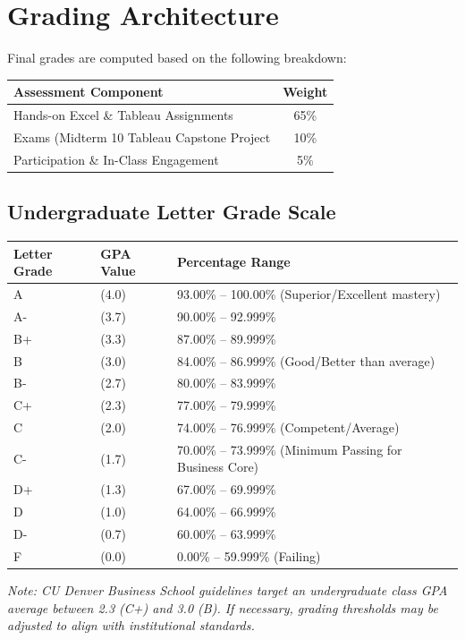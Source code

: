 \documentclass[11pt,a4paper]{article}
\begin{document}
\section*{Grading Architecture}
Final grades are computed based on the following breakdown:
\begin{center}
    \begin{tabular}{lc}
        \toprule
        \textbf{Assessment Component} & \textbf{Weight} \\
        \midrule
        Hands-on Excel \& Tableau Assignments & 65\% \\
        Exams (Midterm 10%
        Tableau Capstone Project & 10\% \\
        Participation \& In-Class Engagement & 5\% \\
        \bottomrule
    \end{tabular}
\end{center}

\subsection*{Undergraduate Letter Grade Scale}
\begin{center}
    \begin{tabular}{llp{7.5cm}}
        \toprule
        \textbf{Letter Grade} & \textbf{GPA Value} & \textbf{Percentage Range} \\
        \midrule
        A  & (4.0) & 93.00\% -- 100.00\% (Superior/Excellent mastery) \\
        A- & (3.7) & 90.00\% -- 92.999\% \\
        B+ & (3.3) & 87.00\% -- 89.999\% \\
        B  & (3.0) & 84.00\% -- 86.999\% (Good/Better than average) \\
        B- & (2.7) & 80.00\% -- 83.999\% \\
        C+ & (2.3) & 77.00\% -- 79.999\% \\
        C  & (2.0) & 74.00\% -- 76.999\% (Competent/Average) \\
        C- & (1.7) & 70.00\% -- 73.999\% (Minimum Passing for Business Core) \\
        D+ & (1.3) & 67.00\% -- 69.999\% \\
        D  & (1.0) & 64.00\% -- 66.999\% \\
        D- & (0.7) & 60.00\% -- 63.999\% \\
        F  & (0.0) & 0.00\% -- 59.999\% (Failing) \\
        \bottomrule
    \end{tabular}
\end{center}
\textit{Note: CU Denver Business School guidelines target an undergraduate class GPA average between 2.3 (C+) and 3.0 (B). If necessary, grading thresholds may be adjusted to align with institutional standards.}
\end{document}
